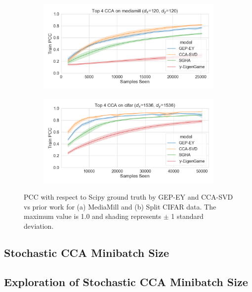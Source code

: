 \begin{figure}%
    \centering
    \begin{subfigure}[b]{0.49\textwidth}
        \centering
        \includegraphics[width=\textwidth]{figures/gradient_descent/CCA/mediamill_100_pcc_lr_tuned.png}
        \label{fig:ccamediamill}
    \end{subfigure}
    \hfill
    \begin{subfigure}[b]{0.49\textwidth}
        \centering
        \includegraphics[width=\textwidth]{figures/gradient_descent/CCA/cifar_100_pcc_lr_tuned.png}
        \label{fig:ccacifar}
    \end{subfigure}
    \caption{PCC with respect to Scipy ground truth by GEP-EY and CCA-SVD vs prior work for (a) MediaMill and (b) Split CIFAR data. The maximum value is 1.0 and shading represents $\pm$ 1 standard deviation.}
    \label{fig:ccaiter}
    \label{fig: stochasticcca}
\end{figure}

\subsection{Stochastic CCA Minibatch Size}

\subsection{Exploration of Stochastic CCA Minibatch Size}

